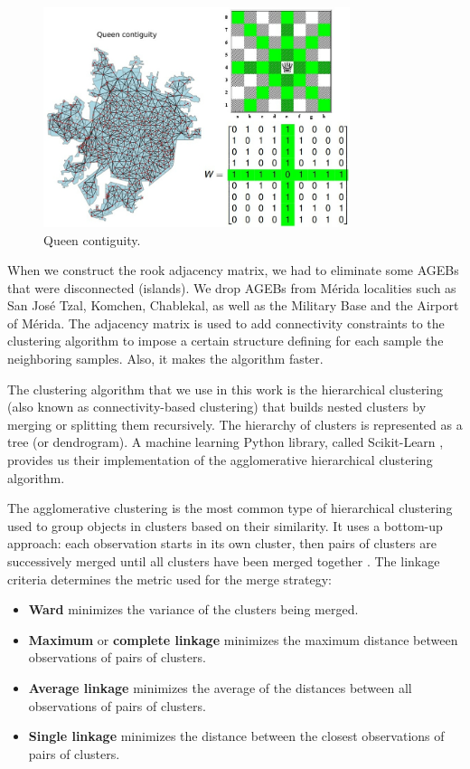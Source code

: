 \begin{figure}[htpb]
  \centering
  \includegraphics[width=0.8\textwidth]{Figures/queen-contiguity.jpg}
  \caption{Queen contiguity.
    \label{fig:queen-contiguity}}
\end{figure}

When we construct the rook adjacency matrix, we had to eliminate some AGEBs that were disconnected (islands). We drop AGEBs from Mérida localities such as San José Tzal, Komchen, Chablekal, as well as the Military Base and the Airport of Mérida. The adjacency matrix is used to add connectivity constraints to the clustering algorithm to impose a certain structure defining for each sample the neighboring samples. Also, it makes the algorithm faster.

The clustering algorithm that we use in this work is the hierarchical clustering (also known as connectivity-based clustering) that builds nested clusters by merging or splitting them recursively. The hierarchy of clusters is represented as a tree (or dendrogram). A machine learning Python library, called Scikit-Learn \cite{scikit-learn}, provides us their implementation of the agglomerative hierarchical clustering algorithm.

The agglomerative clustering is the most common type of hierarchical clustering used to group objects in clusters based on their similarity. It uses a bottom-up approach: each observation starts in its own cluster, then pairs of clusters are successively merged until all clusters have been merged together \cite{hierarchical_scikit}. The linkage criteria determines the metric used for the merge strategy:

\begin{itemize}
\item \textbf{Ward} minimizes the variance of the clusters being merged.
\item \textbf{Maximum} or \textbf{complete linkage} minimizes the maximum distance between observations of pairs of clusters.
\item \textbf{Average linkage} minimizes the average of the distances between all observations of pairs of clusters.
\item \textbf{Single linkage} minimizes the distance between the closest observations of pairs of clusters.
\end{itemize}

